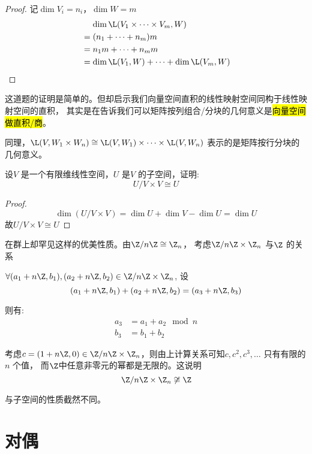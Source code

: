 \begin{proof}
  记\(\dim V_{i}=n_{i}\)，\(\dim W=m\)
  \begin{align*}
    &\mathrel{\phantom{=}}\dim \L(V_{1} \times
    \dots \times V_{m}, W) \\
    &= (n_1+\dots+n_{m})m \\
    &= n_{1}m + \dots + n_{m}m \\
    &= \dim \L(V_{1},W) + \dots +
    \dim \L(V_{m},W)\\
  \end{align*}
\end{proof}
这道题的证明是简单的。但却启示我们向量空间直积的线性映射空间同构于线性映射空间的直积，
其实是在告诉我们可以矩阵按列组合/分块的几何意义是\hl{向量空间做直积/商}。

同理，\(\L(V,W_1\times W_{n})\cong
  \L(V,W_1)\times \dots \times
\L(V,W_{n})\) 表示的是矩阵按行分块的几何意义。

\begin{problem}
  设\(V\) 是一个有限维线性空间，\(U\) 是\(V\) 的子空间，证明:
  \[
    U/V \times V \cong U
  \]
\end{problem}

\begin{proof}
  \[
    \dim (U/V \times V) = \dim U + \dim V - \dim U = \dim U
  \]
  故\(U/V \times V \cong U\)
\end{proof}

在群上却罕见这样的优美性质。由\(\Z/n\Z \cong
\Z_{n}\)，
考虑\(\Z/n\Z\times\Z_{n}\) 与\(\Z\) 的关系

\(\forall (a_1+n\Z, b_1),(a_2+n\Z, b_2) \in
\Z/n\Z \times \Z_{n}\), 设\[
  (a_1+n\Z, b_1)+(a_2+n\Z, b_2) =
  (a_3+n\Z, b_3)
\]

则有:
\begin{align*}
  a_3 &= a_1 + a_2 \mod n \\
  b_3 &= b_1 + b_2
\end{align*}

考虑\(c=(1+n\Z,0) \in \Z/n\Z \times
\Z_{n}\)，则由上计算关系可知\(c, c^{2}, c^{3}, \dots \) 只有有限的\(n\) 个值，
而\(\Z\)中任意非零元的幂都是无限的。这说明
\[
  \Z/n\Z \times \Z_{n} \not\cong \Z
\]

与子空间的性质截然不同。

\section{对偶}

